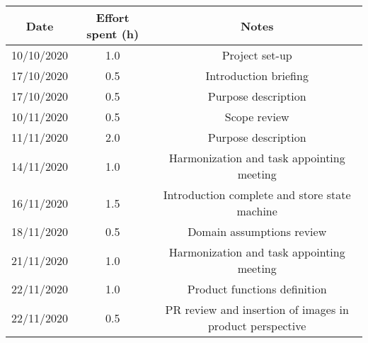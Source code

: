 \documentclass[../../main.tex]{subfiles}
\begin{document}
    \begin{center}
        \begin{tabular}{|c| |c| |c|} 
            \hline
            Date & Effort spent (h) & Notes\\ [0.5ex] 
            \hline\hline
            10/10/2020 & 1.0 & Project set-up\\ 
            17/10/2020 & 0.5 & Introduction briefing\\ 
            17/10/2020 & 0.5 & Purpose description\\ 
            10/11/2020 & 0.5 & Scope review\\
            11/11/2020 & 2.0 & Purpose description\\
            14/11/2020 & 1.0 & Harmonization and task appointing meeting\\
            16/11/2020 & 1.5 & Introduction complete and store state machine\\
            18/11/2020 & 0.5 & Domain assumptions review\\
            21/11/2020 & 1.0 & Harmonization and task appointing meeting\\
            22/11/2020 & 1.0 & Product functions definition\\
            22/11/2020 & 0.5 & PR review and insertion of images in product perspective\\
            \hline
        \end{tabular}
    \end{center}
\end{document}
